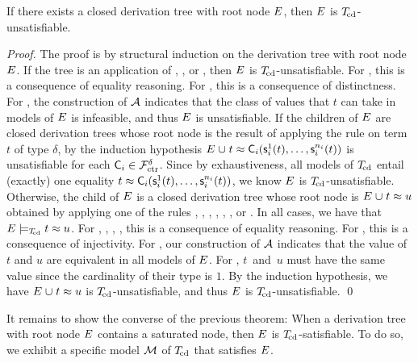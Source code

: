 \begin{theorem}%
\label{thm:rs}%
\afterDot
If there exists a closed derivation tree with root node\/ $E$, then\/ $E$ is $T_{\!\mathrm{cd}}$-unsatisfiable.
\end{theorem}
\begin{proof}
The proof is by structural induction on the derivation tree with root node $E$.
If the tree is an application of , , or ,
then $E$ is $T_{\!\mathrm{cd}}$-unsatisfiable.
For , this is a consequence of equality reasoning.
For , this is a consequence of distinctness.
For , the construction of $\mathcal{A}$ indicates that the class of values that $t$ can take in models of $E$ is infeasible,
and thus $E$ is unsatisfiable.
If the children of $E$ are closed derivation trees
whose root node is the result of applying the rule  on term $t$ of type $\delta$,
by the induction hypothesis $E \mathrel\cup t \approx \textsf{C}_i( \textsf{s}^1_i( t ), \ldots, \textsf{s}^{n_i}_i( t ) )$ is unsatisfiable
for each $\textsf{C}_i \in \mathcal{F}_{\mathrm{ctr}}^\delta$.
Since by exhaustiveness, all models of $T_{\!\mathrm{cd}}$ entail (exactly) one equality $t \approx \textsf{C}_i( \textsf{s}^1_i( t ), \ldots, \textsf{s}^{n_i}_i( t ) )$,
we know $E$ is $T_{\!\mathrm{cd}}$-unsatisfiable.
Otherwise, the child of $E$ is a closed derivation tree
whose root node is $E \mathrel\cup t \approx u$ obtained by applying one of the rules , , , , , , or .
In all cases, we have that $E \models_{T_{\!\mathrm{cd}}} t \approx u$.
For , , , , this is a consequence of equality reasoning.
For , this is a consequence of injectivity.
For , our construction of $\mathcal{A}$ indicates that the value of $t$ and $u$ are equivalent in all models of $E$.
For , $t$~and~$u$ must have the same value since the cardinality of their type is $1$.
By the induction hypothesis, we have $E \mathrel\cup t \approx u$ is $T_{\!\mathrm{cd}}$-unsatisfiable,
and thus $E$ is $T_{\!\mathrm{cd}}$-unsatisfiable.
\qed
\end{proof}

It remains to show the converse of the previous theorem: When a derivation tree
with root node $E$ contains a saturated node, then $E$ is
$T_{\!\mathrm{cd}}$-satisfiable.
To do so, we exhibit a specific model $\mathcal{M}$ of $T_{\!\mathrm{cd}}$ that satisfies $E$.

